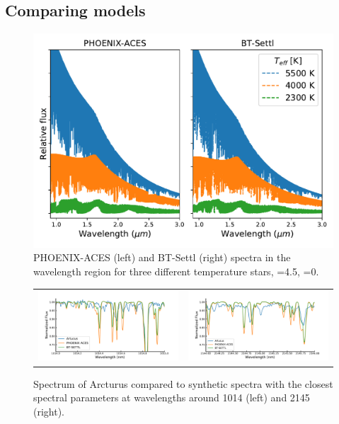 \subsection{Comparing models}
\label{subsec:phoenix_comparision}
 \begin{figure}
    \centering
    \includegraphics[width=0.6\linewidth]{figures/atmos_and_models/phoenix_large_scale_comparision}
    \caption[Large scale comparison between the {PHEONIX-ACES} and {BT-Settl} spectra.]{{PHOENIX-ACES} (left) and {BT-Settl} (right) spectra in the \nir{} wavelength region for three different temperature stars, \Logg{}=4.5, \feh{}=0.}
    \label{fig:phoenixlargescalecomparision}
\end{figure}

\begin{figure}
    \centering
    \begin{tabular}{cc}
        \includegraphics[width=0.48\linewidth]{figures/atmos_and_models/artucus_1micron} & \includegraphics[width=0.48\linewidth]{figures/atmos_and_models/artucus_2micron}\\
    \end{tabular}
    \caption[Comparision of the spectrum of Arcturus to synthetic specta.]{Spectrum of Arcturus compared to synthetic spectra with the closest spectral parameters at wavelengths around 1014\nm{} (left) and 2145\nm{} (right).}
    \label{fig:artucus1-2micron}
\end{figure}

